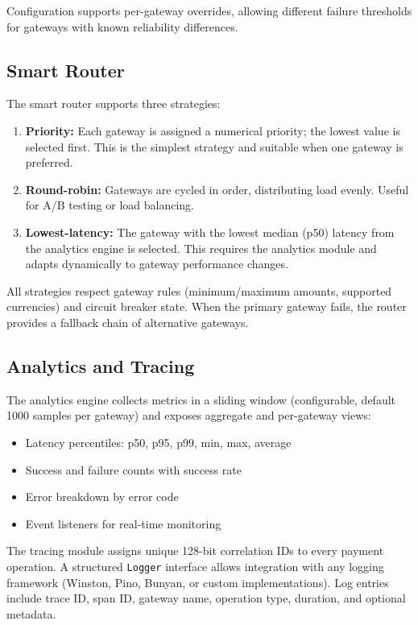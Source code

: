 \documentclass[preprint,12pt]{elsarticle}
\begin{document}
Configuration supports per-gateway overrides, allowing different failure thresholds for gateways with known reliability differences.

\subsection{Smart Router}

The smart router supports three strategies:

\begin{enumerate}
\item \textbf{Priority:} Each gateway is assigned a numerical priority; the lowest value is selected first. This is the simplest strategy and suitable when one gateway is preferred.
\item \textbf{Round-robin:} Gateways are cycled in order, distributing load evenly. Useful for A/B testing or load balancing.
\item \textbf{Lowest-latency:} The gateway with the lowest median (p50) latency from the analytics engine is selected. This requires the analytics module and adapts dynamically to gateway performance changes.
\end{enumerate}

All strategies respect gateway rules (minimum/maximum amounts, supported currencies) and circuit breaker state. When the primary gateway fails, the router provides a fallback chain of alternative gateways.

\subsection{Analytics and Tracing}

The analytics engine collects metrics in a sliding window (configurable, default 1000 samples per gateway) and exposes aggregate and per-gateway views:

\begin{itemize}
\item Latency percentiles: p50, p95, p99, min, max, average
\item Success and failure counts with success rate
\item Error breakdown by error code
\item Event listeners for real-time monitoring
\end{itemize}

The tracing module assigns unique 128-bit correlation IDs to every payment operation. A structured \texttt{Logger} interface allows integration with any logging framework (Winston, Pino, Bunyan, or custom implementations). Log entries include trace ID, span ID, gateway name, operation type, duration, and optional metadata.
\end{document}

